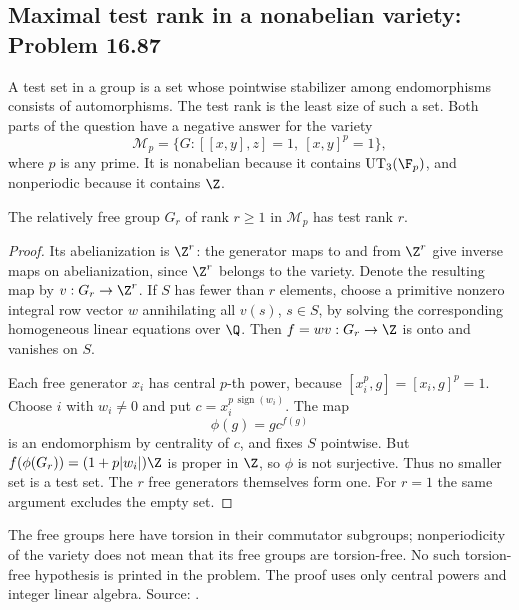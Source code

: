 \subsection{Maximal test rank in a nonabelian variety: Problem 16.87}
\label{cand:16.87}

A test set in a group is a set whose pointwise stabilizer among
endomorphisms consists of automorphisms. The test rank is the least
size of such a set. Both parts of the question have a negative answer
for the variety
\[
 \mathcal M_p=\{G:[[x,y],z]=1,\ [x,y]^p=1\},
\]
where \(p\) is any prime. It is nonabelian because it contains
\(\operatorname{UT}_3(\F_p)\), and nonperiodic because it contains
\(\Z\).

\begin{proposition}
The relatively free group \(G_r\) of rank \(r\geq1\) in
\(\mathcal M_p\) has test rank \(r\).
\end{proposition}
\begin{proof}
Its abelianization is \(\Z^r\): the generator maps to and from
\(\Z^r\) give inverse maps on abelianization, since \(\Z^r\)
belongs to the variety. Denote the resulting map by
\(v:G_r\to\Z^r\). If \(S\) has fewer than \(r\) elements,
choose a primitive nonzero integral row vector \(w\) annihilating
all \(v(s)\), \(s\in S\), by solving the corresponding homogeneous
linear equations over \(\Q\). Then \(f=wv:G_r\to\Z\) is onto
and vanishes on \(S\).

Each free generator \(x_i\) has central \(p\)-th power, because
\([x_i^p,g]=[x_i,g]^p=1\). Choose \(i\) with \(w_i\ne0\)
and put \(c=x_i^{p\,\operatorname{sign}(w_i)}\). The map
\[
 \phi(g)=g c^{f(g)}
\]
is an endomorphism by centrality of \(c\), and fixes \(S\)
pointwise. But
\(f(\phi(G_r))=(1+p|w_i|)\Z\) is proper in \(\Z\), so
\(\phi\) is not surjective. Thus no smaller set is a test set.
The \(r\) free generators themselves form one. For \(r=1\)
the same argument excludes the empty set.
\end{proof}

The free groups here have torsion in their commutator subgroups;
nonperiodicity of the variety does not mean that its free groups
are torsion-free. No such torsion-free hypothesis is printed in
the problem. The proof uses only central powers and integer
linear algebra. Source: .

